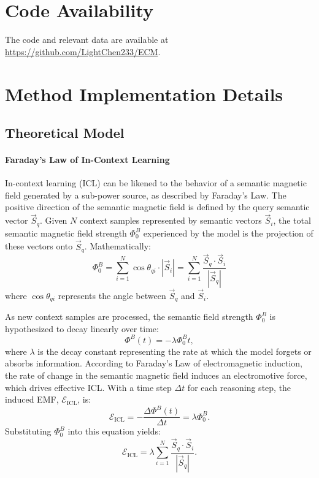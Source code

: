 \section{Code Availability}
The code and relevant data are available at \url{https://github.com/LightChen233/ECM}.



\setcounter{section}{0}
\renewcommand{\thesection}{\Alph{section}}
\section{Method Implementation Details}
\label{sec:method}
\subsection{Theoretical Model}

\paragraph{Faraday's Law of In-Context Learning}
In-context learning (ICL) can be likened to the behavior of a semantic magnetic field generated by a sub-power source, as described by Faraday's Law. The positive direction of the semantic magnetic field is defined by the query semantic vector $\overrightarrow{S}_q$.
Given $N$ context samples represented by semantic vectors $\overrightarrow{S}_i$, the total semantic magnetic field strength $\Phi^B_0$ experienced by the model is the projection of these vectors onto $\overrightarrow{S}_q$. Mathematically:
\begin{equation}
    \Phi^B_0 = \sum^N_{i=1} \cos \theta_{qi} \cdot \left\lvert \overrightarrow{S}_i \right\rvert = \sum^N_{i=1} \frac{\overrightarrow{S}_q \cdot \overrightarrow{S}_i}{\left\lvert \overrightarrow{S}_q \right\rvert}\label{eq:phy-b}
\end{equation}
where $\cos \theta_{qi}$ represents the angle between $\overrightarrow{S}_q$ and $\overrightarrow{S}_i$.

As new context samples are processed, the semantic field strength $\Phi^B_0$ is hypothesized to decay linearly over time:
\begin{equation}
    \Phi^B(t) = -\lambda \Phi^B_0 t,
\end{equation}
where \(\lambda\) is the decay constant representing the rate at which the model forgets or absorbs information.
According to Faraday’s Law of electromagnetic induction, the rate of change in the semantic magnetic field induces an electromotive force, which drives effective ICL. With a time step \(\Delta t\) for each reasoning step, the induced EMF, \(\mathcal{E}_{\text{ICL}}\), is:
\begin{equation}
    \mathcal{E}_{\text{ICL}} = -\frac{\Delta \Phi^B(t)}{\Delta t} = \lambda \Phi^B_0.
\end{equation}
Substituting \(\Phi^B_0\) into this equation yields:
\begin{equation}
    \mathcal{E}_{\text{ICL}} = \lambda \sum^N_{i=1} \frac{\overrightarrow{S}_q \cdot \overrightarrow{S}_i}{\left\lvert \overrightarrow{S}_q \right\rvert}.
\end{equation}

